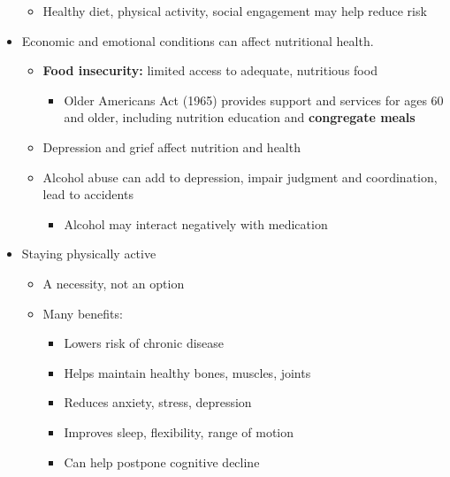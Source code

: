 \documentclass[12pt]{article}
\begin{document}
\begin{itemize}
                    \begin{itemize}
                        \item Healthy diet, physical activity, social engagement may help reduce risk
                    \end{itemize}
                \item Economic and emotional conditions can affect nutritional health.
                    \begin{itemize}
                        \item \textbf{Food insecurity:} limited access to adequate, nutritious food
                            \begin{itemize}
                                \item Older Americans Act (1965) provides support and services for ages 60 and older, including nutrition education and \textbf{congregate meals}
                            \end{itemize}
                        \item Depression and grief affect nutrition and health
                        \item Alcohol abuse can add to depression, impair judgment and coordination, lead to accidents
                            \begin{itemize}
                                \item Alcohol may interact negatively with medication
                            \end{itemize}
                    \end{itemize}
                \item Staying physically active
                    \begin{itemize}
                        \item A necessity, not an option
                        \item Many benefits:
                            \begin{itemize}
                                \item Lowers risk of chronic disease
                                \item Helps maintain healthy bones, muscles, joints
                                \item Reduces anxiety, stress, depression
                                \item Improves sleep, flexibility, range of motion
                                \item Can help postpone cognitive decline

\end{itemize}
\end{itemize}
\end{itemize}
\end{document}
